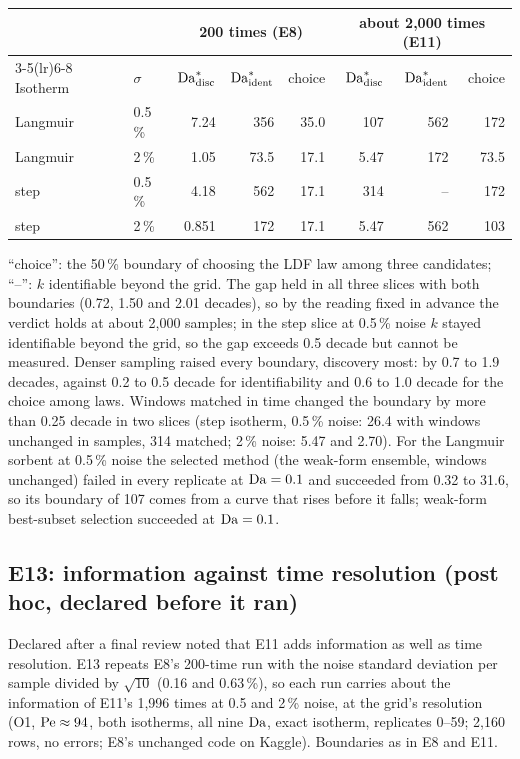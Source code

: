 \begin{center}
\small
\begin{tabular}{llrrrrrr}
\toprule
& & \multicolumn{3}{c}{200 times (E8)} & \multicolumn{3}{c}{about 2,000 times (E11)} \\
\cmidrule(lr){3-5}\cmidrule(lr){6-8}
Isotherm & $\sigma$ & $\mathrm{Da}^{*}_{\mathrm{disc}}$ & $\mathrm{Da}^{*}_{\mathrm{ident}}$ & choice & $\mathrm{Da}^{*}_{\mathrm{disc}}$ & $\mathrm{Da}^{*}_{\mathrm{ident}}$ & choice \\
\midrule
Langmuir & 0.5\,\% & 7.24 & 356 & 35.0 & 107 & 562 & 172 \\
Langmuir & 2\,\% & 1.05 & 73.5 & 17.1 & 5.47 & 172 & 73.5 \\
step & 0.5\,\% & 4.18 & 562 & 17.1 & 314 & -- & 172 \\
step & 2\,\% & 0.851 & 172 & 17.1 & 5.47 & 562 & 103 \\
\bottomrule
\end{tabular}
\end{center}
``choice'': the 50\,\% boundary of choosing the LDF law among three candidates; ``--'': $k$
identifiable beyond the grid. The gap held in all three slices with both boundaries (0.72, 1.50
and 2.01 decades), so by the reading fixed in advance the verdict holds at about 2,000 samples; in
the step slice at 0.5\,\% noise $k$ stayed identifiable beyond the grid, so the gap exceeds
0.5 decade but cannot be measured. Denser sampling raised every boundary,
discovery most: by 0.7 to 1.9 decades, against 0.2 to 0.5 decade for identifiability and 0.6 to 1.0
decade for the choice among laws. Windows matched in time changed the boundary by more than 0.25 decade in two slices (step
isotherm, 0.5\,\% noise: 26.4 with windows unchanged in samples, 314 matched; 2\,\% noise: 5.47 and
2.70). For the Langmuir sorbent at 0.5\,\% noise the selected method (the weak-form ensemble,
windows unchanged) failed in every replicate at $\mathrm{Da} = 0.1$ and succeeded from 0.32 to 31.6, so
its boundary of 107 comes from a curve that rises before it falls; weak-form best-subset selection
succeeded at $\mathrm{Da} = 0.1$.

\subsection*{E13: information against time resolution (post hoc, declared before it ran)}
Declared after a final review noted that E11 adds information as well as time resolution. E13 repeats E8's
200-time run with the noise standard deviation per sample divided by $\sqrt{10}$ (0.16 and 0.63\,\%), so
each run carries about the information of E11's 1,996 times at 0.5 and 2\,\% noise, at the grid's resolution
(O1, $\mathrm{Pe} \approx 94$, both isotherms, all nine $\mathrm{Da}$, exact isotherm, replicates 0--59; 2,160 rows, no errors;
E8's unchanged code on Kaggle). Boundaries as in E8 and E11.


